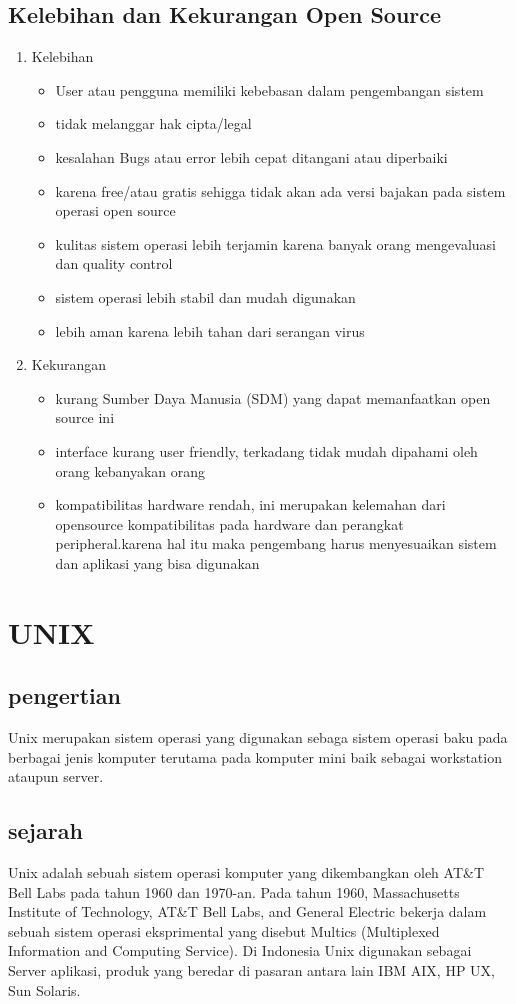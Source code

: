 \subsection{Kelebihan dan Kekurangan Open Source}
\begin{enumerate}
\item Kelebihan
\begin{itemize}
\item User atau pengguna memiliki kebebasan dalam pengembangan sistem
\item tidak melanggar hak cipta/legal
\item kesalahan Bugs atau error lebih cepat ditangani atau diperbaiki
\item karena free/atau gratis sehigga tidak akan ada versi bajakan pada sistem operasi open source
\item kulitas sistem operasi lebih terjamin karena banyak orang mengevaluasi dan quality control
\item sistem operasi lebih stabil dan mudah digunakan
\item lebih aman karena lebih tahan dari serangan virus
\end{itemize}

\item Kekurangan
\begin{itemize}
\item kurang Sumber Daya Manusia (SDM) yang dapat memanfaatkan open source ini
\item interface kurang user friendly, terkadang tidak mudah dipahami oleh orang kebanyakan orang
\item kompatibilitas hardware rendah, ini merupakan kelemahan dari opensource kompatibilitas pada hardware dan perangkat peripheral.karena hal itu maka pengembang harus menyesuaikan sistem dan aplikasi yang bisa digunakan
\end{itemize}

\end{enumerate}

\section{UNIX}
\subsection{pengertian}
	Unix merupakan sistem operasi yang digunakan sebaga sistem operasi baku pada berbagai jenis komputer terutama pada komputer mini baik sebagai workstation ataupun server.
\subsection{sejarah}
	Unix adalah sebuah sistem operasi komputer yang dikembangkan oleh AT\&T Bell Labs pada tahun 1960 dan 1970-an. Pada tahun 1960, Massachusetts Institute of Technology, AT\&T Bell Labs, and General Electric bekerja dalam sebuah sistem operasi eksprimental yang disebut Multics (Multiplexed Information and Computing Service).
	Di Indonesia Unix digunakan sebagai Server aplikasi, produk yang beredar di pasaran antara lain IBM AIX, HP UX, Sun Solaris.
